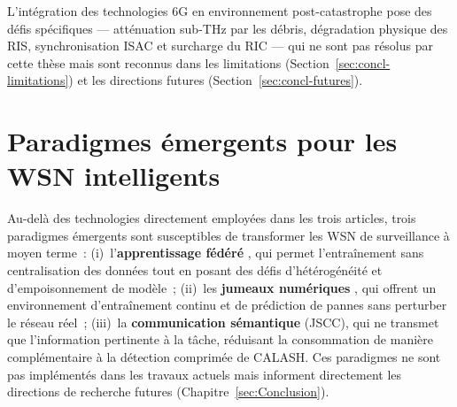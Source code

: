 \begin{table}[htbp]
\centering
\caption{Technologies habilitantes 6G et leur apport aux WSN de surveillance des catastrophes.}
\label{tab:6g-comparison}
\end{table}

L'intégration des technologies 6G en environnement post-catastrophe pose des défis spécifiques --- atténuation sub-THz par les débris, dégradation physique des RIS, synchronisation ISAC et surcharge du RIC --- qui ne sont pas résolus par cette thèse mais sont reconnus dans les limitations (Section~\ref{sec:concl-limitations}) et les directions futures (Section~\ref{sec:concl-futures}).


\section{Paradigmes émergents pour les WSN intelligents}\label{sec:revlit-emerging}

Au-delà des technologies directement employées dans les trois articles, trois paradigmes émergents sont susceptibles de transformer les WSN de surveillance à moyen terme~: (i)~l'\textbf{apprentissage fédéré} \cite{McMahan2017FedAvg,Li2020FedProx}, qui permet l'entraînement sans centralisation des données tout en posant des défis d'hétérogénéité et d'empoisonnement de modèle~; (ii)~les \textbf{jumeaux numériques} \cite{Nguyen2024DTORAN}, qui offrent un environnement d'entraînement continu et de prédiction de pannes sans perturber le réseau réel~; (iii)~la \textbf{communication sémantique} (JSCC), qui ne transmet que l'information pertinente à la tâche, réduisant la consommation de manière complémentaire à la détection comprimée de CALASH. Ces paradigmes ne sont pas implémentés dans les travaux actuels mais informent directement les directions de recherche futures (Chapitre~\ref{sec:Conclusion}).


